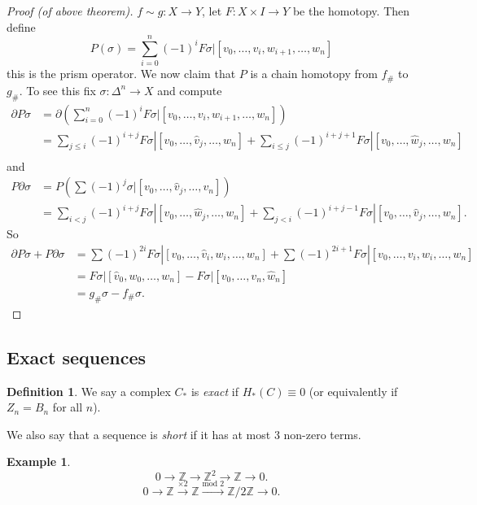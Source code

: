\documentclass[12pt]{article}
\theoremstyle{definition}
\theoremstyle{definition}
\newtheorem*{defn}{Definition}
\newtheorem*{ex}{Example}
\newcommand{\ZZ}{\mathbb{Z}}
\newcommand{\C}{C_*}
\renewcommand{\H}{H_*}
\begin{document}
\begin{proof}[Proof (of above theorem)]
$f\sim g\colon X \to Y$, let $F\colon X \times I \to Y$ be the homotopy.
Then define
\[
P(\sigma) = \sum_{i=0}^{n} (-1)^i F\sigma|[v_0,\ldots,v_{i},w_{i+1},\ldots,w_n]
\]
this is the prism operator.
We now claim that $P$ is a chain homotopy from $f_\#$ to $g_\#$.
To see this fix $\sigma\colon\Delta^n\to X$ and compute
\begin{align*}
\partial P\sigma
&= \partial\left(\sum_{i=0}^{n} (-1)^i F\sigma|[v_0,\ldots,v_{i},w_{i+1},\ldots,w_n]\right)\\
&= \sum_{j \le i} (-1)^{i+j} F\sigma|[v_0,\ldots,\hat{v}_{j},\ldots,w_n] + \sum_{i \le j} (-1)^{i+j+1} F\sigma|[v_0,\ldots,\hat{w}_{j},\ldots,w_n]\\
\end{align*}
and
\begin{align*}
P\partial \sigma 
&= P\left(\sum (-1)^j \sigma|[v_0,\ldots,\hat{v}_j,\ldots,v_n]\right)\\
&= \sum_{i<j} (-1)^{i+j} F\sigma|[v_0,\ldots,\hat{w}_j,\ldots,w_n] + \sum_{j<i} (-1)^{i+j-1} F\sigma|[v_0,\ldots,\hat{v}_j,\ldots,w_n].
\end{align*}
So 
\begin{align*}
\partial P \sigma + P \partial \sigma &= \sum (-1)^{2i} F\sigma |[v_0,\ldots,\hat v_i,w_i,\ldots,w_n] + \sum (-1)^{2i+1} F\sigma |[v_0,\ldots,v_i,\hat w_i,\ldots,w_n]\\
&= F\sigma |[\hat v_0,w_0,\ldots,w_n] - F\sigma | [v_0,\ldots,v_n,\hat w_n] \\
&= g_\# \sigma -  f_\# \sigma.
\end{align*}
\end{proof}

\subsection{Exact sequences}
\begin{defn}
We say a complex $\C$ is \emph{exact} if $\H(C) \equiv 0$ (or equivalently if $Z_n = B_n$ for all $n$).

We also say that a sequence is \emph{short} if it has at most 3 non-zero terms.
\end{defn}

\begin{ex}
\[
0 \to \ZZ \to \ZZ^2 \to \ZZ \to 0.
\]
\[
0 \to \ZZ \xrightarrow{\times 2} \ZZ \xrightarrow{\text{mod }2} \ZZ/2\ZZ \to 0.
\]
\end{ex}
\end{document}
